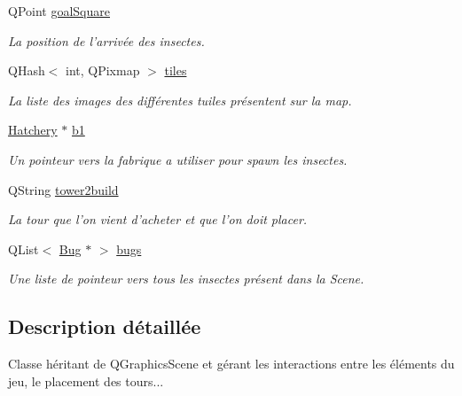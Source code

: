 \begin{DoxyCompactItemize}
QPoint \hyperlink{classRender_a08247005a2c595988f8a0ab14a8b1ad9}{goalSquare}
\begin{DoxyCompactList}\small\item\em La position de l'arrivée des insectes. \end{DoxyCompactList}\item 
QHash$<$ int, QPixmap $>$ \hyperlink{classRender_aaa10cde2c7a766914312f85d7c7eb25c}{tiles}
\begin{DoxyCompactList}\small\item\em La liste des images des différentes tuiles présentent sur la map. \end{DoxyCompactList}\item 
\hyperlink{classHatchery}{Hatchery} $\ast$ \hyperlink{classRender_ac6b86ad92172fefa5b9a56b31e9055d3}{b1}
\begin{DoxyCompactList}\small\item\em Un pointeur vers la fabrique a utiliser pour spawn les insectes. \end{DoxyCompactList}\item 
QString \hyperlink{classRender_ae8f2c323913fe8b89e0e7f443ef41ae0}{tower2build}
\begin{DoxyCompactList}\small\item\em La tour que l'on vient d'acheter et que l'on doit placer. \end{DoxyCompactList}\item 
QList$<$ \hyperlink{classBug}{Bug} $\ast$ $>$ \hyperlink{classRender_a3d5b29479d129b61c6ad8f3eec2f1f76}{bugs}
\begin{DoxyCompactList}\small\item\em Une liste de pointeur vers tous les insectes présent dans la Scene. \end{DoxyCompactList}\end{DoxyCompactItemize}


\subsection{Description détaillée}
Classe héritant de QGraphicsScene et gérant les interactions entre les éléments du jeu, le placement des tours... 

